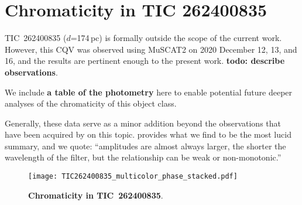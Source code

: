 \documentclass[11pt,twocolumn,tighten]{aastex63}
\begin{document}
\section{Chromaticity in TIC 262400835}

TIC~262400835 ($d$=174\,pc) is formally outside the scope of the
current work.  However, this CQV was observed using MuSCAT2 on 2020
December 12, 13, and 16, and the results are pertinent enough to the
present work.
{\bf todo: describe observations}.

We include {\bf a table of the photometry} here to enable potential
future deeper analyses of the chromaticity of this object class.

Generally, these data serve as a minor addition beyond the
observations that have been acquired by
\citet[e.g.][]{2017PASJ...69L...2O,2020PASJ...72...23T,2022AJ....163..144G,2023MNRAS.518.2921K}
on this topic.  \citet{2023MNRAS.518.2921K} provides what we find to
be the most lucid summary, and we quote: ``amplitudes are almost
always larger, the shorter the wavelength of the filter, but the
relationship can be weak or non-monotonic.''

\begin{figure*}[!t]
	\begin{center}
    \texttt{[image: TIC262400835\_multicolor\_phase\_stacked.pdf]}
    	\end{center}
    \vspace{-0.4cm}
		\caption{
	      {\bf Chromaticity in TIC~262400835}.
		}
		\label{fig:muscat}
\end{figure*}



\clearpage
\listofchanges
\end{document}
